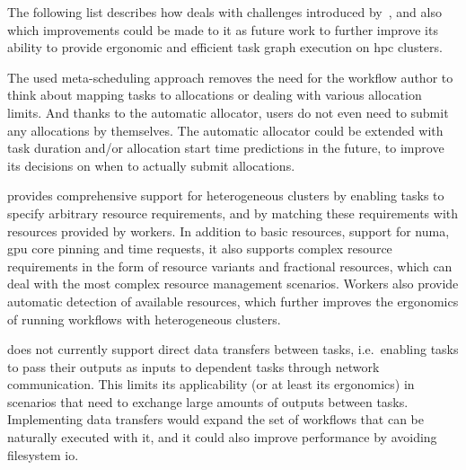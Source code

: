 The following list describes how \hyperqueue{} deals with challenges introduced
by~, and also which improvements could be made to it as future work to
further improve its ability to provide ergonomic and efficient task graph execution on
\gls{hpc} clusters.
\begin{description}[wide=0pt]
	\item[Interaction with allocation manager] The used meta-scheduling approach removes the need for the workflow author to think about mapping
		tasks to allocations or dealing with various allocation limits. And thanks to the automatic
		allocator, users do not even need to submit any allocations by themselves. The automatic allocator
		could be extended with task duration and/or allocation start time predictions in the future, to
		improve its decisions on when to actually submit allocations.
	\item[Cluster heterogeneity] \hyperqueue{} provides comprehensive support for heterogeneous
		clusters by enabling tasks to specify arbitrary resource requirements, and by matching these
		requirements with resources provided by workers. In addition to basic resources, support for
		\gls{numa}, \gls{gpu} core pinning and time requests, it also
		supports complex resource requirements in the form of resource variants and fractional resources,
		which can deal with the most complex resource management scenarios. Workers also provide automatic
		detection of available resources, which further improves the ergonomics of running workflows with
		heterogeneous clusters.
	\item[Data transfers] \hyperqueue{} does not currently support direct data transfers
		between tasks, i.e.\ enabling tasks to pass their outputs as inputs to dependent tasks through
		network communication. This limits its applicability (or at least its ergonomics) in scenarios that
		need to exchange large amounts of outputs between tasks. Implementing data transfers would expand
		the set of workflows that can be naturally executed with it, and it could also improve performance
		by avoiding filesystem \gls{io}.


\end{description}

